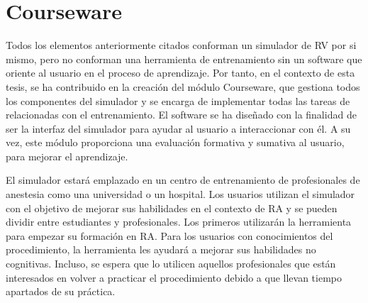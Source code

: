 \section{Courseware}
\label{rasim:courseware}
Todos los elementos anteriormente citados conforman un simulador de \ac{RV} por si mismo, pero no conforman una herramienta de entrenamiento sin un software que oriente al usuario en el proceso de aprendizaje. Por tanto, en el contexto de esta tesis, se ha contribuido en la creación del módulo \ac{Courseware}, que gestiona todos los componentes del simulador y se encarga de implementar todas las tareas de relacionadas con el entrenamiento. El software se ha diseñado con la finalidad de ser la interfaz del simulador para ayudar al usuario a interaccionar con él. A su vez, este módulo proporciona una evaluación formativa y sumativa al usuario, para mejorar el aprendizaje.





El simulador estará emplazado en un centro de entrenamiento de profesionales de anestesia como una universidad o un hospital. Los usuarios utilizan el simulador con el objetivo de mejorar sus habilidades en el contexto de \ac{RA} y se pueden dividir entre estudiantes y profesionales. Los primeros utilizarán la herramienta para empezar su formación en \ac{RA}. Para los usuarios con conocimientos del procedimiento, la herramienta les ayudará a mejorar sus habilidades no cognitivas. Incluso, se espera que lo utilicen aquellos profesionales que están interesados en volver a practicar el procedimiento debido a que llevan tiempo apartados de su práctica.


